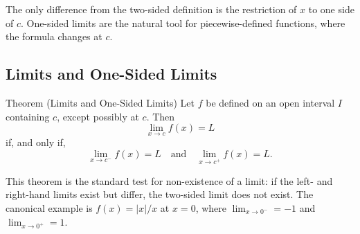 \begin{remark*}
The only difference from the two-sided definition is the
restriction of $x$ to one side of $c$.
One-sided limits are the natural tool for piecewise-defined
functions, where the formula changes at $c$.
\end{remark*}

\subsection*{Limits and One-Sided Limits}

\begin{theorembox}{Theorem (Limits and One-Sided Limits)}
Let $f$ be defined on an open interval $I$ containing $c$,
except possibly at $c$. Then
\[
  \lim_{x \to c} f(x) = L
\]
if, and only if,
\[
  \lim_{x \to c^-} f(x) = L \quad \text{and} \quad
  \lim_{x \to c^+} f(x) = L.
\]
\end{theorembox}

\begin{remark*}
This theorem is the standard test for non-existence of a limit:
if the left- and right-hand limits exist but differ, the
two-sided limit does not exist.
The canonical example is $f(x) = |x|/x$ at $x = 0$, where
$\lim_{x \to 0^-} = -1$ and $\lim_{x \to 0^+} = 1$.
\end{remark*}